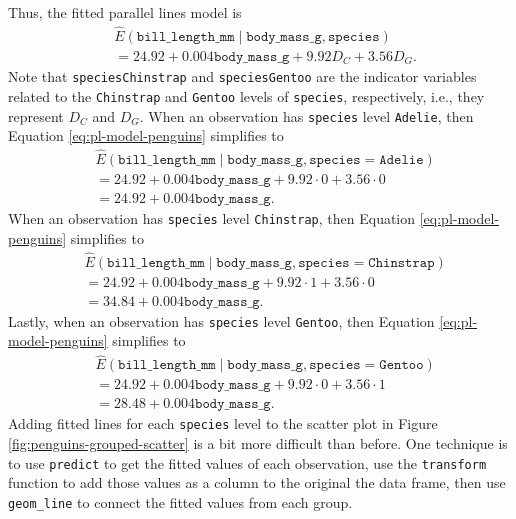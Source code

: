\documentclass[
]{book}
\theoremstyle{definition}
\theoremstyle{definition}
\theoremstyle{definition}
\theoremstyle{definition}
\theoremstyle{remark}
\begin{document}
Thus, the fitted parallel lines model is
\[
\begin{aligned}
&\hat{E}(\mathtt{bill\_length\_mm} \mid \mathtt{body\_mass\_g}, \mathtt{species}) \\
&= 24.92 + 0.004 \mathtt{body\_mass\_g} + 9.92 D_C + 3.56 D_G.
\end{aligned}
\label{eq:pl-model-penguins}
\]
Note that \texttt{speciesChinstrap} and \texttt{speciesGentoo} are the indicator variables related to the \texttt{Chinstrap} and \texttt{Gentoo} levels of \texttt{species}, respectively, i.e., they represent \(D_C\) and \(D_G\). When an observation has \texttt{species} level \texttt{Adelie}, then Equation \eqref{eq:pl-model-penguins} simplifies to
\[
\begin{aligned}
&\hat{E}(\mathtt{bill\_length\_mm} \mid \mathtt{body\_mass\_g}, \mathtt{species}=\mathtt{Adelie}) \\
&=24.92 + 0.004 \mathtt{body\_mass\_g} + 9.92 \cdot 0 + 3.56 \cdot 0 \\
&= 24.92 + 0.004 \mathtt{body\_mass\_g}.
\end{aligned}
\]
When an observation has \texttt{species} level \texttt{Chinstrap}, then Equation \eqref{eq:pl-model-penguins} simplifies to
\[
\begin{aligned}
&\hat{E}(\mathtt{bill\_length\_mm} \mid \mathtt{body\_mass\_g}, \mathtt{species}=\mathtt{Chinstrap}) \\
&=24.92 + 0.004 \mathtt{body\_mass\_g} + 9.92 \cdot 1 + 3.56 \cdot 0 \\
&= 34.84 + 0.004 \mathtt{body\_mass\_g}.
\end{aligned}
\]
Lastly, when an observation has \texttt{species} level \texttt{Gentoo}, then Equation \eqref{eq:pl-model-penguins} simplifies to
\[
\begin{aligned}
&\hat{E}(\mathtt{bill\_length\_mm} \mid \mathtt{body\_mass\_g}, \mathtt{species}=\mathtt{Gentoo}) \\
&=24.92 + 0.004 \mathtt{body\_mass\_g} + 9.92 \cdot 0 + 3.56 \cdot 1 \\
&= 28.48 + 0.004 \mathtt{body\_mass\_g}.
\end{aligned}
\]
Adding fitted lines for each \texttt{species} level to the scatter plot in Figure \ref{fig:penguins-grouped-scatter} is a bit more difficult than before. One technique is to use \texttt{predict} to get the fitted values of each observation, use the \texttt{transform} function to add those values as a column to the original the data frame, then use \texttt{geom\_line} to connect the fitted values from each group.
\end{document}
